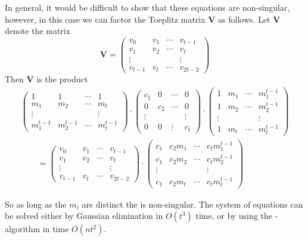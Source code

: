 In general, it would be difficult to show that these equations are
non-singular, however, in this case we can factor the Toeplitz matrix
$\mathbf{V}$ as follows.  Let $\mathbf{V}$ denote the matrix
\[
\mathbf{V} = \begin{pmatrix}v_0 & v_1 & \cdots & v_{t-1} \\
v_1 & v_2 & \cdots & v_t \\
\vdots & & & \vdots\\
v_{t-1} & v_t & \cdots & v_{2t-2}\end{pmatrix}
\]
Then $\mathbf{V}$ is the product
\small
\[
\begin{aligned}
\begin{pmatrix}1 & 1 & \cdots & 1 \\
m_1 & m_2 & \cdots & m_t \\
\vdots & & & \vdots\\
m_1^{t-1} & m_2^{t-1} & \cdots & m_t^{t-1} \end{pmatrix}
\cdot
\begin{pmatrix}c_1 & 0 & \cdots & 0\\
0 & c_2 & \cdots & 0 \\
\vdots & & & \vdots \\
0 & 0 & \vdots & c_t\end{pmatrix}
\cdot
\begin{pmatrix}
1& m_1 & \cdots & m_1^{t-1}\\
1& m_2 & \cdots & m_2^{t-1}\\
\vdots& & & \vdots\\
1& m_t  & \cdots & m_t^{t-1}\end{pmatrix} \\
\qquad = \begin{pmatrix}v_0 & v_1 & \cdots & v_{t-1} \\
v_1 & v_2 & \cdots & v_t \\
\vdots & & & \vdots\\
v_{t-1} & v_t & \cdots & v_{2t-2}\end{pmatrix} 
\cdot
\begin{pmatrix}
c_1& c_2 m_1 & \cdots & c_t m_1^{t-1}\\
c_1 & c_2 m_2 & \cdots & c_t m_2^{t-1}\\
\vdots& & & \vdots\\
c_1& c_2 m_t  & \cdots & c_t m_t^{t-1}\end{pmatrix}
\end{aligned}
\]
\normalsize

So as long as the $m_i$ are distinct the  is
non-singular.  The system of equations  can be
solved either by Gaussian elimination in $O(t^3)$ time, or by using
the {\Berlekamp}-{\Massey} algorithm
\cite{Massey1969-oe,Blahut1983-jc} in time $O(nt^2)$. 

